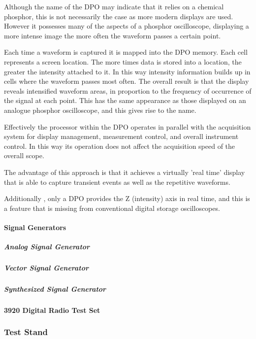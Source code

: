 Although the name of the DPO may indicate that it relies on a chemical phosphor, this is not necessarily the case as more modern displays are used. However it possesses many of the aspects of a phosphor oscilloscope, displaying a more intense image the more often the waveform passes a certain point.

Each time a waveform is captured it is mapped into the DPO memory. Each cell represents a screen location. The more times data is stored into a location, the greater the intensity attached to it. In this way intensity information builds up in cells where the waveform passes most often. The overall result is that the display reveals intensified waveform areas, in proportion to the frequency of occurrence of the signal at each point. This has the same appearance as those displayed on an analogue phosphor oscilloscope, and this gives rise to the name.

Effectively the processor within the DPO operates in parallel with the acquisition system for display management, measurement control, and overall instrument control. In this way its operation does not affect the acquisition speed of the overall scope.

The advantage of this approach is that it achieves a virtually 'real time' display that is able to capture transient events as well as the repetitive waveforms.

Additionally , only a DPO provides the Z (intensity) axis in real time, and this is a feature that is missing from conventional digital storage oscilloscopes.

\paragraph{Signal Generators}

\subparagraph{Analog Signal Generator}

\subparagraph{Vector Signal Generator}

\subparagraph{Synthesized Signal Generator}

\paragraph{3920 Digital Radio Test Set}




\subsubsection{Test Stand}

